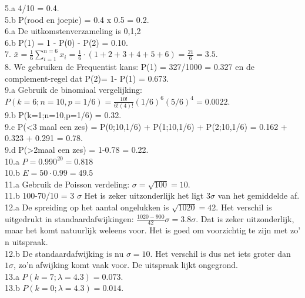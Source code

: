 5.a 4/10 = 0.4.\\
5.b P(rood en joepie) = 0.4 x 0.5 = 0.2.\\


6.a De uitkomstenverzameling is {0,1,2}\\
6.b P(1) = 1 - P(0) - P(2) = 0.10.\\


7. $\bar{x} = \frac{1}{6} \sum_{i=1}^{n=6} x_i = \frac{1}{6} \cdot (1+2+3+4+5+6) = \frac{21}{6} = 3.5$.\\


8. We gebruiken de Frequentist kans: P(1) = 327/1000 = 0.327 en de complement-regel dat P(2)= 1- P(1) = 0.673.\\


9.a Gebruik de binomiaal vergelijking: ${\displaystyle P(k=6;n=10,p=1/6) = \frac{10!}{6!(4)!} (1/6)^6 (5/6)^{4} = 0.0022} $.\\
9.b P(k=1;n=10,p=1/6) = 0.32.\\
9.c P(<3 maal een zes) = P(0;10,1/6) + P(1;10,1/6) + P(2;10,1/6) = 0.162 + 0.323 + 0.291 = 0.78.\\
9.d P(>2maal  een zes) = 1-0.78 = 0.22.\\


10.a $P = 0.990^{20} =  0.818$\\
10.b $E = 50\cdot 0.99 = 49.5$\\


11.a Gebruik de Poisson verdeling: $\sigma = \sqrt{100} = 10$.\\
11.b 100-70/10 = 3 $ \sigma $ Het is zeker uitzonderlijk het ligt $3\sigma$ van het gemiddelde af.\\


12.a De spreiding op het aantal ongelukken is $\sqrt{1020} = 42$. Het verschil is uitgedrukt in standaardafwijkingen: $\frac{1020-900}{42} \sigma = 3.8 \sigma$. Dat is zeker uitzonderlijk, maar het komt natuurlijk weleens voor. Het is goed om voorzichtig te zijn met zo' n uitspraak.\\
12.b De standaardafwijking is nu $\sigma = 10$. Het verschil is dus net iets groter dan $1\sigma$, zo'n afwijking komt vaak voor. De uitspraak lijkt ongegrond.\\


13.a $P(k=7;\lambda=4.3) =0.073$.\\
13.b $P(k=0;\lambda=4.3) =0.014$.\\

